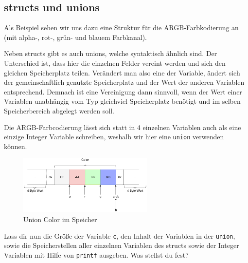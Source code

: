 \subsection{structs und unions}


Als Beispiel sehen wir uns dazu eine Struktur für die ARGB-Farbkodierung an (mit alpha-, rot-, grün- und blauem Farbkanal). 



Neben structs gibt es auch unions, welche syntaktisch ähnlich sind.
Der Unterschied ist, dass hier die einzelnen Felder vereint werden und sich den gleichen Speicherplatz teilen. 
Verändert man also eine der Variable, ändert sich der gemeinschaftlich genutzte Speicherplatz und der Wert der anderen Variablen entsprechend. 
Demnach ist eine Vereinigung dann sinnvoll, wenn der Wert einer Variablen unabhängig vom Typ gleichviel Speicherplatz benötigt und im selben Speicherbereich abgelegt werden soll.


Die ARGB-Farbcodierung lässt sich statt in 4 einzelnen Variablen auch als eine einzige Integer Variable schreiben, weshalb wir hier eine \lstinline{union} verwenden können.

\begin{figure}[!htb]
	\centering
	\includegraphics[width=0.6\textwidth]{./05_c/figures/Color_Channels.pdf}
	\caption{Union Color im Speicher}
	\label{fig:color_channels}
\end{figure} 



Lass dir nun die Größe der Variable \lstinline{c}, den Inhalt der Variablen in der \lstinline{union}, sowie die Speicherstellen aller einzelnen Variablen des structs sowie der Integer Variablen mit Hilfe von \lstinline{printf} ausgeben. Was stellst du fest? 

